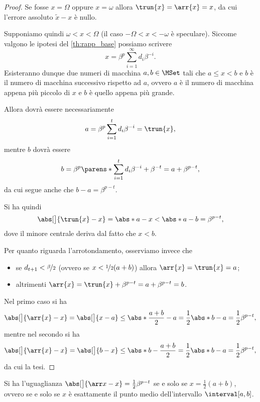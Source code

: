 \begin{proof}
    Se fosse $x = \Omega$ oppure $x = \omega$  allora $\trun{x} = \arr{x} = x$, da cui l'errore assoluto $\tilde x - x$ è nullo.  

    Supponiamo quindi $\omega < x < \Omega$ (il caso $-\Omega < x < -\omega$ è speculare). Siccome valgono le ipotesi del \autoref{th:rapp_base} possiamo scrivere \[
        x = \beta^p\sum_{i=1}^\infty d_i\beta^{-i}.
    \] Esisteranno dunque due numeri di macchina $a, b \in \MSet$ tali che $a \leq x < b$ e $b$ è il numero di macchina successivo rispetto ad $a$, ovvero $a$ è il numero di macchina appena più piccolo di $x$ e $b$ è quello appena più grande.

    Allora dovrà essere necessariamente \[
        a = \beta^p\sum_{i=1}^t d_i\beta^{-i} = \trun{x},
    \] mentre $b$ dovrà essere \[
        b = \beta^p\parens*{\sum_{i=1}^t d_i\beta^{-i} + \beta^{-t}} = a + \beta^{p-t},
    \] da cui segue anche che $b - a = \beta^{p-t}$. 

    Si ha quindi \[
        \abs[\big]{\trun{x} - x} 
            = \abs*{a - x}
            < \abs*{a - b} 
            = \beta^{p-t},
    \] dove il minore centrale deriva dal fatto che $x < b$.
    
    Per quanto riguarda l'arrotondamento, osserviamo invece che \begin{itemize}
        \item se $d_{t+1} < \nicefrac{\beta}{2}$ (ovvero se $x < \nicefrac12(a + b)$) allora $\arr{x} = \trun{x} = a$;
        \item altrimenti $\arr{x} = \trun{x} + \beta^{p-t} = a + \beta^{p-t} = b$.
    \end{itemize}

    Nel primo caso si ha \[
        \abs[\big]{\arr{x} - x} 
            =    \abs[\big]{x - a}
            \leq \abs*{\frac{a+b}{2} - a} 
            =    \frac12\abs*{b-a} 
            =    \frac12\beta^{p-t},
    \] mentre nel secondo si ha 
    \[
        \abs[\big]{\arr{x} - x} 
            =    \abs[\big]{b - x}
            \leq \abs*{b - \frac{a+b}{2}} 
            =    \frac12\abs*{b - a} 
            =    \frac12\beta^{p-t},
    \] da cui la tesi.
\end{proof} 

\begin{remark}
    \label{rem:abs_err_arr} Si ha l'uguaglianza $\abs[\big]{\arr x - x} = \frac12\beta^{p-t}$ se e solo se $x = \frac12(a + b)$, ovvero se e solo se $x$ è esattamente il punto medio dell'intervallo $\interval[{a, b}]$.
\end{remark}

